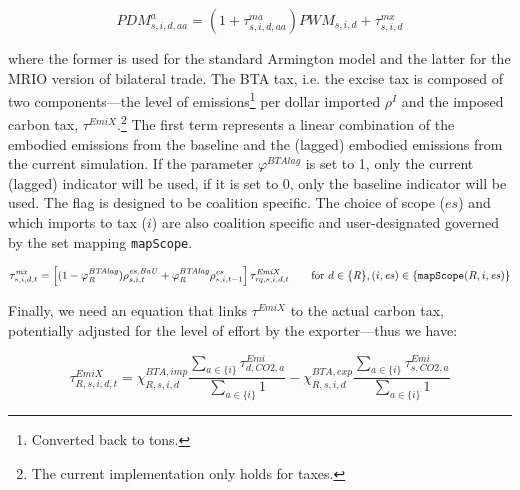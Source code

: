 \documentclass[11pt,letterpaper]{report}
\begin{document}
\begin{equation}
\label{eq:pdmax}
\mathit{PDM}^a_{s,i,d,\mathit{aa}} =
   \left( 1 + \tau^\mathit{ma}_{s,i,d,\mathit{aa}} \right) \mathit{PWM}_{s,i,d} + \tau^\mathit{mx}_{s,i,d}
\end{equation}

\noindent where the former is used for the standard Armington model and the latter
for the MRIO version of bilateral trade. The BTA tax, i.e. the excise
tax is composed of two components---the
level of \COT{} emissions\footnote{Converted back to tons.} per dollar imported $\rho^\mathit{I}$ and
the imposed carbon tax, $\tau^{\mathit{EmiX}}$.\footnote{The current implementation only holds for \COT{}
taxes.} The first term represents
a linear combination of the embodied emissions
from the baseline and the (lagged) embodied
emissions from the current simulation.
If the parameter $\varphi^{\mathit{BTAlag}}$
is set to 1, only the current (lagged) indicator
will be used, if it is set to 0, only
the baseline indicator will be used. The
flag is designed to be coalition specific.
The choice of scope ($\mathit{es}$) and
which imports to tax ($i$) are
also coalition specific and user-designated
governed by the set mapping \texttt{mapScope}.

\begin{equation}
\label{eq:taumx}
\tau^\mathit{mx}_{s,i,d,t} =
\left[(1-\varphi^{\mathit{BTAlag}}_{\mathit{R}}) \rho^{\mathit{es},\mathit{BaU}}_{s,i,t}
+ \varphi^{\mathit{BTAlag}}_{\mathit{R}}
\rho^{\mathit{es}}_{s,i,t-1}
\right]
\tau^{\mathit{EmiX}}_{\mathit{rq},s,i,d,t}
\qquad \textnormal{for } d \in \{\mathit{R}\},
(i,\mathit{es}) \in \{\texttt{mapScope}(R,i,\mathit{es})\}
\end{equation}

Finally, we need an equation that links
$\tau^{\mathit{EmiX}}$ to the actual
carbon tax, potentially
adjusted for the level of effort
by the exporter---thus we have:

\begin{equation}
\label{eq:tauEmix}
\tau^{\mathit{EmiX}}_{\mathit{R},s,i,d,t} =
\chi^{\mathit{BTA},\mathit{imp}}_{\mathit{R},s,i,d}
\frac{\displaystyle \sum_{a \in \{i\}}{\tau^{\mathit{Emi}}_{d,\mathit{CO2},a}}}
{\displaystyle\sum_{a \in \{i\}}{1}}
- \chi^{\mathit{BTA},\mathit{exp}}_{\mathit{R},s,i,d}
\frac{\displaystyle\sum_{a \in \{i\}}{\tau^{\mathit{Emi}}_{s,\mathit{CO2},a}}}
{\displaystyle\sum_{a \in \{i\}}{1}}
\end{equation}
\end{document}
